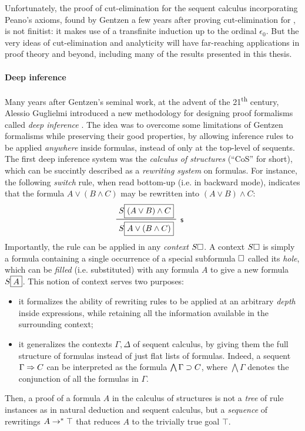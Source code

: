 Unfortunately, the proof of cut-elimination for the sequent calculus
incorporating Peano's axioms, found by Gentzen a few years after proving
cut-elimination for  , is
not finitist: it makes use of a transfinite induction up to the ordinal
$\epsilon_0$. But the very ideas of cut-elimination and analyticity will have
far-reaching applications in proof theory and beyond, including many of the
results presented in this thesis.

\paragraph{Deep inference}

Many years after Gentzen's seminal work, at the advent of the
21\textsuperscript{th} century, Alessio Guglielmi introduced a new methodology
for designing proof formalisms called \emph{deep inference}
. The idea was to overcome some limitations of
Gentzen formalisms while preserving their good properties, by allowing inference
rules to be applied \emph{anywhere} inside formulas, instead of only at the
top-level of sequents. The
first deep inference system was the \emph{calculus of structures} (``CoS'' for
short), which can be succintly described as a \emph{rewriting system} on
formulas. For instance, the following \emph{switch} rule, when read bottom-up
(i.e. in backward mode), indicates that the formula $A \lor (B \land C)$ may be
rewritten into $(A \lor B) \land C$:
$$\R[\rsf{s}]{S\select{(A \lor B) \land C}}{S\select{A \lor (B \land C)}}$$
Importantly, the rule can be applied in any \emph{context} $S\square$. A context
$S\square$ is simply a formula containing a single occurrence of a special
subformula $\square$ called its \emph{hole}, which can be \emph{filled} (i.e.
substituted) with any formula $A$ to give a new formula $S\fbox{$A$}$. This
notion of context serves two purposes:
\begin{itemize}
  \item it formalizes the ability of rewriting rules to be applied at an
  arbitrary \emph{depth} inside expressions, while retaining all the information
  available in the surrounding context;
  \item it generalizes the contexts $\Gamma, \Delta$ of sequent calculus, by
  giving them the full structure of formulas instead of just flat lists of
  formulas. Indeed, a sequent $\Gamma \Rightarrow C$ can be interpreted as the formula
  $\bigwedge \Gamma \supset C$, where $\bigwedge \Gamma$ denotes the conjunction
  of all the formulas in $\Gamma$.
\end{itemize}
Then, a proof of a formula $A$ in the calculus of structures is not a
\emph{tree} of rule instances as in natural deduction and sequent calculus, but
a \emph{sequence} of rewritings $A \rightarrow^\ast \top$ that reduces $A$ to the
trivially true goal $\top$.

